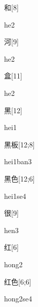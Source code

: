\begin{verbete}[he2]{和}[8]
\begin{pronuncia}{he2}
\end{pronuncia}
\end{verbete}

\begin{verbete}[he2]{河}[9]
\begin{pronuncia}{he2}
\end{pronuncia}
\end{verbete}

\begin{verbete}[he2]{盒}[11]
\begin{pronuncia}{he2}
\end{pronuncia}
\end{verbete}

\begin{verbete}[hei1]{黑}[12]
\begin{pronuncia}{hei1}
\end{pronuncia}
\end{verbete}

\begin{verbete}{黑板}[12;8]
\begin{pronuncia}{hei1ban3}
\end{pronuncia}
\end{verbete}

\begin{verbete}[hei1se4]{黑色}[12;6]
\begin{pronuncia}{hei1se4}
\end{pronuncia}
\end{verbete}

\begin{verbete}[hen3]{很}[9]
\begin{pronuncia}{hen3}
\end{pronuncia}
\end{verbete}

\begin{verbete}[hong2]{红}[6]
\begin{pronuncia}{hong2}
\end{pronuncia}
\end{verbete}

\begin{verbete}[hong2se4]{红色}[6;6]
\begin{pronuncia}{hong2se4}
\end{pronuncia}
\end{verbete}

